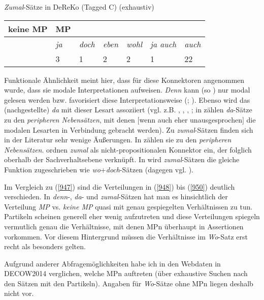 {\begin{exe}
	\ex\label{950} \textit{Zumal}-Sätze in DeReKo (Tagged C) (exhaustiv) \\[-1em]
    \begin{tabular}[t]{|l|l|l|l|l|l|l|}
    \hline
    keine MP & MP & & & & & \\
    \hline
    & \textit{ja} & \textit{doch} & \textit{eben} & \textit{wohl} & \textit{ja auch} & \textit{auch}\\
    \hline
    & 3 & 1 & 2 & 2 & 1 & 22\\
    \hline	 
    \end{tabular}   
\end{exe}
Funktionale Ähnlichkeit meint hier, dass für diese Konnektoren angenommen wurde, dass sie modale Interpretationen  aufweisen. \textit{Denn} kann (so \citealt[320]{Volodina2010}) nur modal gelesen werden bzw. favorisiert diese Interpretationsweise (\citealt[270]{Bluehdorn2006}; \citeyear[29]{Bluehdorn2008}). Ebenso wird das (nachgestellte) \textit{da} mit dieser Lesart assoziiert (vgl. z.B. \citealt[335]{Pasch1983}, \citealt[182]{Rosengren1987}, \citealt[2303]{Zifonun1997}, \citealt[397]{Pasch2003}; in \citealt[411, 415]{Frey2012} zählen \textit{da}-Sätze zu den \textit{peripheren Nebensätzen},  mit denen $[$wenn auch eher unausgesprochen$]$ die modalen Lesarten in Verbindung gebracht werden). Zu \textit{zumal}-Sätzen finden sich in der Literatur sehr wenige Äußerungen. In \citet[6]{Bluehdorn2014} zählen sie zu den \textit{peripheren Nebensätzen}. \citet[397]{Pasch2003} ordnen \textit{zumal} als nicht-propositionalen Konnektor ein, der folglich oberhalb der Sachverhalts\-ebene verknüpft. In \citet[81]{Heidolph1981} wird \textit{zumal}-Sätzen die gleiche Funktion zugeschrieben wie \textit{wo}+\textit{doch}-Sätzen (dagegen vgl. \citealt[78-79]{Borst1985}).

Im Vergleich zu (\ref{947}) sind die Verteilungen in (\ref{948}) bis (\ref{950}) deutlich verschieden. In \textit{denn}-,\textit{ da}- und \textit{zumal}-Sätzen hat man es hinsichtlich der Verteilung \textit{MP} vs. \textit{keine MP} quasi mit genau gespiegelten Verhältnissen zu tun. Partikeln scheinen generell eher wenig aufzutreten und diese Verteilungen spiegeln vermutlich genau die Verhältnisse, mit denen MPn überhaupt in Assertionen vorkommen. Vor diesem Hintergrund müssen die Verhältnisse im \textit{Wo}-Satz erst recht als besonders gelten.

Aufgrund anderer Abfragemöglichkeiten habe ich in den Webdaten in DECOW2014 verglichen, welche MPn auftreten (über exhaustive Suchen nach den Sätzen mit den Partikeln). Angaben für \textit{Wo}-Sätze ohne MPn liegen deshalb nicht vor.

}
